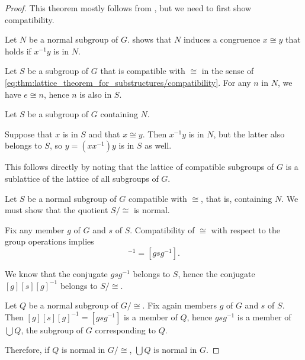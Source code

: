 \begin{proof}
  This theorem mostly follows from , but we need to first show compatibility.

  Let \( N \) be a normal subgroup of \( G \).  shows that \( N \) induces a congruence \( x \cong y \) that holds if \( x^{-1} y \) is in \( N \).


  \SufficiencySubProof* Let \( S \) be a subgroup of \( G \) that is compatible with \( {\cong} \) in the sense of \eqref{eq:thm:lattice_theorem_for_substructures/compatibility}. For any \( n \) in \( N \), we have \( e \cong n \), hence \( n \) is also in \( S \).

  \NecessitySubProof* Let \( S \) be a subgroup of \( G \) containing \( N \).

  Suppose that \( x \) is in \( S \) and that \( x \cong y \). Then \( x^{-1} y \) is in \( N \), but the latter also belongs to \( S \), so \( y = (x x^{-1}) y \) is in \( S \) as well.

   This follows directly by noting that the lattice of compatible subgroups of \( G \) is a sublattice of the lattice of all subgroups of \( G \).


  \SufficiencySubProof* Let \( S \) be a normal subgroup of \( G \) compatible with \( {\cong} \), that is, containing \( N \). We must show that the quotient \( S / {\cong} \) is normal.

  Fix any member \( g \) of \( G \) and \( s \) of \( S \). Compatibility of \( {\cong} \) with respect to the group operations implies
  \begin{equation*}
    [g] [s] [g]^{-1} = [g s g^{-1}].
  \end{equation*}

  We know that the conjugate \( g s g^{-1} \) belongs to \( S \), hence the conjugate \( [g] [s] [g]^{-1} \) belongs to \( S / {\cong} \).

  \NecessitySubProof* Let \( Q \) be a normal subgroup of \( G / {\cong} \). Fix again members \( g \) of \( G \) and \( s \) of \( S \). Then \( [g] [s] [g]^{-1} = [g s g^{-1}] \) is a member of \( Q \), hence \( g s g^{-1} \) is a member of \( \bigcup Q \), the subgroup of \( G \) corresponding to \( Q \).

  Therefore, if \( Q \) is normal in \( G / {\cong} \), \( \bigcup Q \) is normal in \( G \).
\end{proof}

